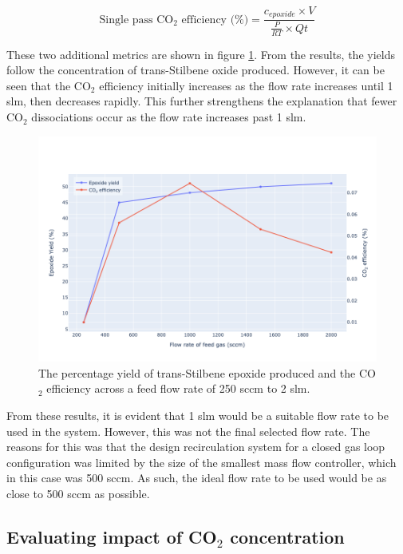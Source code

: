 \begin{equation}
    \text{Single pass CO$_2$ efficiency (\%)} = \frac{c_{epoxide} \times V}{\frac{P}{RT} \times Qt}
\end{equation}

These two additional metrics are shown in figure \ref{fig:flow_rate_yield_efficiency}. From the results, the yields follow the concentration of trans-Stilbene oxide produced. However, it can be seen that the CO$_2$ efficiency initially increases as the flow rate increases until 1 slm, then decreases rapidly. This further strengthens the explanation that fewer CO$_2$ dissociations occur as the flow rate increases past 1 slm.

\begin{figure}[h!]
	\centering
    \includegraphics[width=\linewidth]{chapter_6/figures/flow_rate_yield_efficiency.png} 
	\caption{The percentage yield of trans-Stilbene epoxide produced and the CO$_2$ efficiency across a feed flow rate of 250 sccm to 2 slm.}
	\label{fig:flow_rate_yield_efficiency}
\end{figure} 

From these results, it is evident that 1 slm would be a suitable flow rate to be used in the system. However, this was not the final selected flow rate. The reasons for this was that the design recirculation system for a closed gas loop configuration was limited by the size of the smallest mass flow controller, which in this case was 500 sccm. As such, the ideal flow rate to be used would be as close to 500 sccm as possible.

\subsection{Evaluating impact of CO$_2$ concentration}

